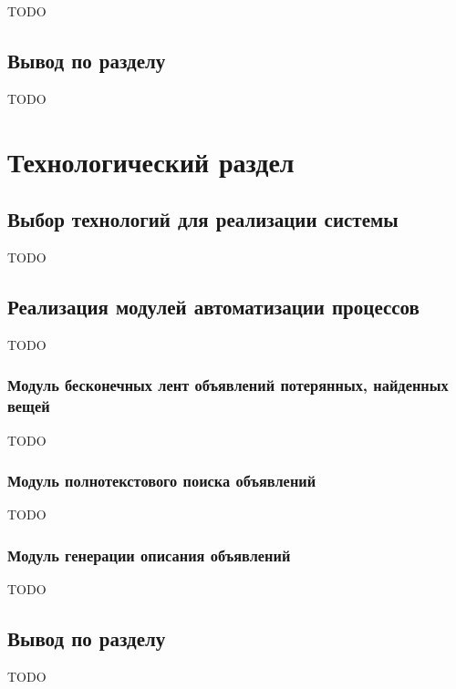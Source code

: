 \documentclass{mirea}
\begin{document}
TODO

\subsection*{Вывод по разделу}

TODO

\section{Технологический раздел}

\subsection{Выбор технологий для реализации системы}

TODO

\subsection{Реализация модулей автоматизации процессов}

TODO

\subsubsection{Модуль бесконечных лент объявлений потерянных, найденных вещей}

TODO

\subsubsection{Модуль полнотекстового поиска объявлений}

TODO

\subsubsection{Модуль генерации описания объявлений}

TODO

\subsection*{Вывод по разделу}

TODO
\end{document}
